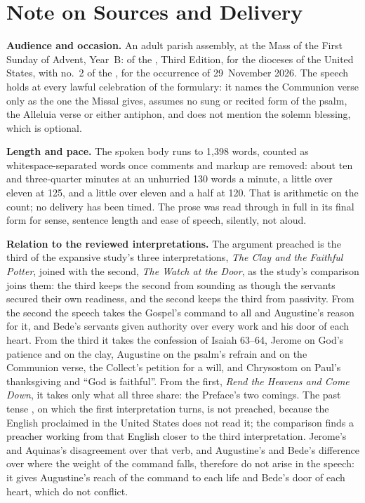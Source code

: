 
\section*{Note on Sources and Delivery}

{\small

\textbf{Audience and occasion.} An adult parish assembly, at the Mass of the
First Sunday of Advent, Year~B:  of the , Third Edition, for the dioceses of the United States, with no.~2 of
the , for the occurrence of 29~November 2026. The
speech holds at every lawful celebration of the formulary: it names the
Communion verse only as the one the Missal gives, assumes no sung or recited
form of the psalm, the Alleluia verse or either antiphon, and does not
mention the solemn blessing, which is optional.

\textbf{Length and pace.} The spoken body runs to 1,398 words, counted as
whitespace-separated words once comments and markup are removed: about ten
and three-quarter minutes at an unhurried 130 words a minute, a little over
eleven at 125, and a little over eleven and a half at 120. That is
arithmetic on the count; no delivery has been timed. The prose was read
through in full in its final form for sense, sentence length and ease of
speech, silently, not aloud.

\textbf{Relation to the reviewed interpretations.} The argument preached is
the third of the expansive study's three interpretations, \textit{The Clay
and the Faithful Potter}, joined with the second, \textit{The Watch at the
Door}, as the study's comparison joins them: the third keeps the second from
sounding as though the servants secured their own readiness, and the second
keeps the third from passivity. From the second the speech takes the Gospel's
command to all and Augustine's reason for it, and Bede's servants given
authority over every work and his door of each heart. From the third it takes
the confession of Isaiah 63--64, Jerome on God's patience and on the clay,
Augustine on the psalm's refrain and on the Communion verse, the Collect's
petition for a will, and Chrysostom on Paul's thanksgiving and ``God is
faithful''. From the first, \textit{Rend the Heavens and Come Down}, it takes
only what all three share: the Preface's two comings. The past tense
, on which the first interpretation turns, is not
preached, because the English proclaimed in the United States does not read
it; the comparison finds a preacher working from that English closer to the
third interpretation. Jerome's and Aquinas's disagreement over that verb, and
Augustine's and Bede's difference over where the weight of the command falls,
therefore do not arise in the speech: it gives Augustine's reach of the
command to each life and Bede's door of each heart, which do not conflict.

}
